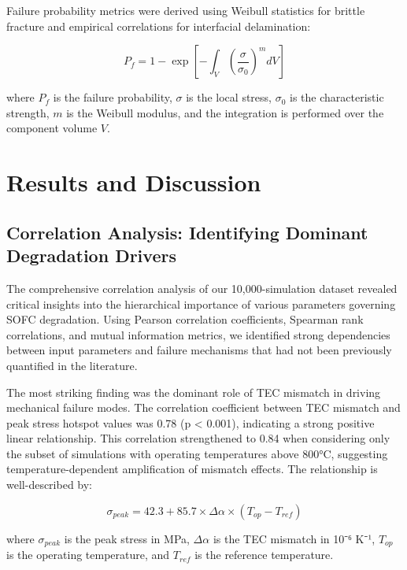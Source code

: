 \documentclass[conference]{IEEEtran}
\begin{document}
Failure probability metrics were derived using Weibull statistics for brittle fracture and empirical correlations for interfacial delamination:

\begin{equation}
P_f = 1 - \exp\left[-\int_V \left(\frac{\sigma}{\sigma_0}\right)^m dV\right]
\end{equation}

where $P_f$ is the failure probability, $\sigma$ is the local stress, $\sigma_0$ is the characteristic strength, $m$ is the Weibull modulus, and the integration is performed over the component volume $V$.

\section{Results and Discussion}

\subsection{Correlation Analysis: Identifying Dominant Degradation Drivers}

The comprehensive correlation analysis of our 10,000-simulation dataset revealed critical insights into the hierarchical importance of various parameters governing SOFC degradation. Using Pearson correlation coefficients, Spearman rank correlations, and mutual information metrics, we identified strong dependencies between input parameters and failure mechanisms that had not been previously quantified in the literature.

The most striking finding was the dominant role of TEC mismatch in driving mechanical failure modes. The correlation coefficient between TEC mismatch and peak stress hotspot values was 0.78 (p < 0.001), indicating a strong positive linear relationship. This correlation strengthened to 0.84 when considering only the subset of simulations with operating temperatures above 800°C, suggesting temperature-dependent amplification of mismatch effects. The relationship is well-described by:

\begin{equation}
\sigma_{peak} = 42.3 + 85.7 \times \Delta\alpha \times (T_{op} - T_{ref})
\end{equation}

where $\sigma_{peak}$ is the peak stress in MPa, $\Delta\alpha$ is the TEC mismatch in 10⁻⁶ K⁻¹, $T_{op}$ is the operating temperature, and $T_{ref}$ is the reference temperature.
\end{document}
